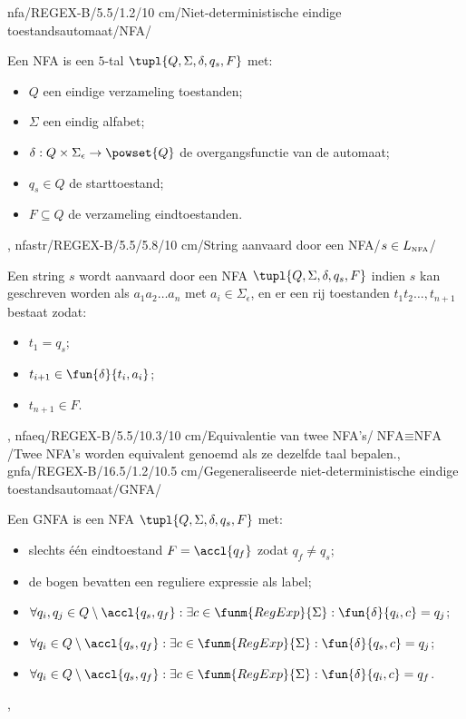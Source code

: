 nfa/REGEX-B/5.5/1.2/10 cm/Niet-deterministische eindige toestandsautomaat/NFA/{Een NFA is een $5$-tal $\tupl{Q,\Sigma,\delta,q_s,F}$ met:\begin{itemize}\item $Q$ een eindige verzameling toestanden;\item $\Sigma$ een eindig alfabet;\item $\delta:Q\times\Sigma_{\epsilon}\rightarrow\powset{Q}$ de overgangsfunctie van de automaat;\item $q_s\in Q$ de starttoestand;\item $F\subseteq Q$ de verzameling eindtoestanden.\end{itemize}},
nfastr/REGEX-B/5.5/5.8/10 cm/String aanvaard door een NFA/$s\in L_{\mbox{\tiny NFA}}$/{Een string $s$ wordt aanvaard door een NFA $\tupl{Q,\Sigma,\delta,q_s,F}$ indien $s$ kan geschreven worden als $a_1a_2\ldots a_n$ met $a_i\in\Sigma_{\epsilon}$, en er een rij toestanden $t_1t_2\ldots,t_{n+1}$ bestaat zodat:\begin{itemize}\item $t_1=q_s$;\item $t_{i+1}\in\fun{\delta}{t_i,a_i}$;\item $t_{n+1}\in F$.\end{itemize}},
nfaeq/REGEX-B/5.5/10.3/10 cm/Equivalentie van twee NFA's/$\mbox{NFA}\equiv\mbox{NFA}$/{Twee NFA's worden equivalent genoemd als ze dezelfde taal bepalen.},
gnfa/REGEX-B/16.5/1.2/10.5 cm/Gegeneraliseerde niet-deterministische eindige toestandsautomaat/GNFA/{Een GNFA is een NFA $\tupl{Q,\Sigma,\delta,q_s,F}$ met:\begin{itemize}\item slechts \'e\'en eindtoestand $F=\accl{q_f}$ zodat $q_f\neq q_s$;\item de bogen bevatten een reguliere expressie als label;\item $\forall q_i,q_j\in Q\setminus\accl{q_s,q_f}:\exists c\in\funm{RegExp}{\Sigma}:\fun{\delta}{q_i,c}=q_j$;\item $\forall q_i\in Q\setminus\accl{q_s,q_f}:\exists c\in\funm{RegExp}{\Sigma}:\fun{\delta}{q_s,c}=q_j$;\item $\forall q_i\in Q\setminus\accl{q_s,q_f}:\exists c\in\funm{RegExp}{\Sigma}:\fun{\delta}{q_i,c}=q_f$.\end{itemize}},
